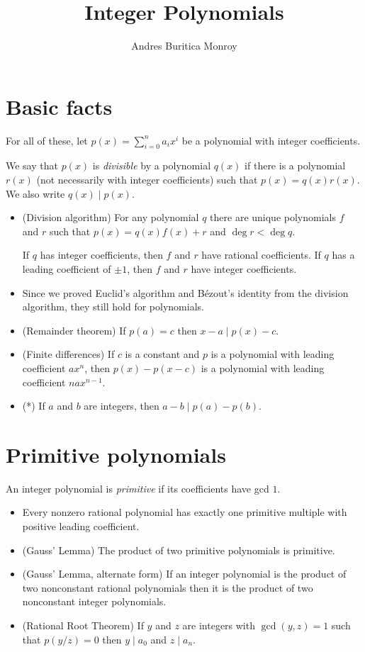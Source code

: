 \documentclass{article}
\title{Integer Polynomials}
\author{Andres Buritica Monroy}
\date{}
\begin{document}
\maketitle
\section{Basic facts}
For all of these, let $p(x)=\sum_{i=0}^n a_i x^i$ be a polynomial with integer
coefficients.

We say that $p(x)$ is \emph{divisible} by a polynomial $q(x)$ if there is a
polynomial $r(x)$ (not necessarily with integer coefficients) such that
$p(x)=q(x)r(x)$. We also write $q(x)\mid p(x)$.
\begin{itemize}
	\item (Division algorithm) For any polynomial $q$ there are unique
	      polynomials $f$ and $r$ such that $p(x)=q(x)f(x)+r$ and $\deg r<\deg q$.

	      If $q$ has integer coefficients, then $f$ and $r$ have rational
	      coefficients. If $q$ has a leading coefficient of $\pm 1$, then $f$ and $r$
	      have integer coefficients.
	\item Since we proved Euclid's algorithm and B\'ezout's identity from the
	      division algorithm, they still hold for polynomials.
	\item (Remainder theorem) If $p(a)=c$ then $x-a\mid p(x)-c$.
	\item (Finite differences) If $c$ is a constant and $p$ is a polynomial with
	      leading coefficient $ax^n$, then $p(x)-p(x-c)$ is a polynomial with
	      leading coefficient $nax^{n-1}$.
	\item (*) If $a$ and $b$ are integers, then $a-b\mid p(a)-p(b)$.
\end{itemize}
\section{Primitive polynomials}
An integer polynomial is \emph{primitive} if its coefficients have gcd $1$.
\begin{itemize}
	\item Every nonzero rational polynomial has exactly one primitive multiple
	      with positive leading coefficient.
	\item (Gauss' Lemma) The product of two primitive polynomials is primitive.
	\item (Gauss' Lemma, alternate form) If an integer polynomial is the product
	      of two nonconstant rational polynomials then it is the product of two
	      nonconstant integer polynomials.
	\item (Rational Root Theorem) If $y$ and $z$ are integers with $\gcd(y,z)=1$
	      such that $p(y/z)=0$ then $y\mid a_0$ and $z\mid a_n$.
\end{itemize}
\end{document}
